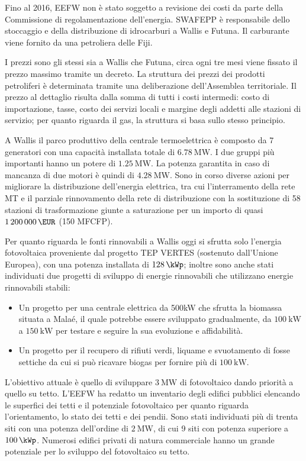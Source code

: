 \documentclass[fleqn,11pt]{SelfArx} %
\begin{document}
Fino al 2016, EEFW non è stato soggetto a revisione dei costi da parte della Commissione di regolamentazione dell'energia.
SWAFEPP è responsabile dello stoccaggio e della distribuzione di idrocarburi a Wallis e Futuna. 
Il carburante viene fornito da una petroliera delle Fiji.

I prezzi sono gli stessi sia a Wallis che Futuna, circa ogni tre mesi viene fissato il prezzo massimo tramite un decreto.
La struttura dei prezzi dei prodotti petroliferi è determinata tramite una deliberazione dell'Assemblea territoriale.
Il prezzo al dettaglio risulta dalla somma di tutti i costi intermedi: costo di importazione, tasse, costo dei servizi locali e margine degli addetti alle stazioni di servizio; per quanto riguarda il gas, la struttura si basa sullo stesso principio.

A Wallis il parco produttivo della centrale termoelettrica è composto da 7 generatori con una capacità installata totale di \(\SI{6.78}{\MW}\).
I due gruppi più importanti hanno un potere di \(\SI{1.25}{\MW}\). 
La potenza garantita in caso di mancanza di due motori è quindi di \(\SI{4.28}{\MW}\).
Sono in corso diverse azioni per migliorare la distribuzione dell'energia elettrica, tra cui l'interramento della rete MT e il parziale rinnovamento della rete di distribuzione con la sostituzione di 58 stazioni di trasformazione giunte a saturazione per un importo di quasi \(\SI{1200000}{\EUR}\) (150 MFCFP).

Per quanto riguarda le fonti rinnovabili a Wallis oggi si sfrutta solo l'energia fotovoltaica proveniente dal progetto TEP VERTES (sostenuto dall'Unione Europea), con una potenza installata di \(\SI{128}{\kWp}\); inoltre sono anche stati individuati due progetti di sviluppo di energie rinnovabili che utilizzano energie rinnovabili stabili:
\begin{itemize}
	\item Un progetto per una centrale elettrica da 500kW che sfrutta la biomassa situata a Malaé, il quale potrebbe essere sviluppato gradualmente, da \(\SI{100}{\kW}\) a \(\SI{150}{\kW}\) per testare e seguire la sua evoluzione e affidabilità.
	\item Un progetto per il recupero di rifiuti verdi, liquame e svuotamento di fosse settiche da cui si può ricavare biogas per fornire più di \(\SI{100}{\kW}\).
\end{itemize}

L'obiettivo attuale è quello di sviluppare \(\SI{3}{\MW}\) di fotovoltaico dando priorità a quello su tetto.
L'EEFW ha redatto un inventario degli edifici pubblici elencando le superfici dei tetti e il potenziale fotovoltaico per quanto riguarda l'orientamento, lo stato dei tetti e dei pendii.
Sono stati individuati più di trenta siti con una potenza dell'ordine di \(\SI{2}{\MW}\), di cui 9 siti con potenza superiore a \(\SI{100}{\kWp}\).
Numerosi edifici privati di natura commerciale hanno un grande potenziale per lo sviluppo del fotovoltaico su tetto.
\end{document}

